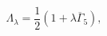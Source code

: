 \begin{equation}
\Lambda _\lambda =\frac 12\left( 1+\lambda \overline{\Gamma
}_5\right) , \label{74}
\end{equation}

